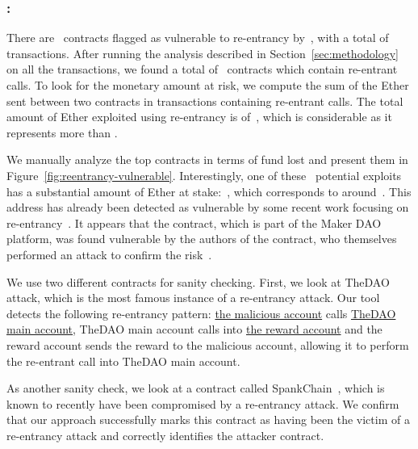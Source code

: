 \subsubsection{\vre: \reentrancy}
\label{ssec:analysis-re}
There are~ contracts flagged as vulnerable to re-entrancy by~\cite{Luu2016a,Tsankov2018,DBLP:conf/ndss/KalraGDS18}, with a total of~ transactions. After running the analysis described in Section~\ref{sec:methodology} on all the transactions, we found a total of~ contracts which contain re-entrant calls. To look for the monetary amount at risk, we compute the sum of the Ether sent between two contracts in transactions containing re-entrant calls. The total amount of Ether exploited using re-entrancy is of~, which is considerable as it represents more than .

We manually analyze the top contracts in terms of fund lost and present them in Figure~\ref{fig:reentrancy-vulnerable}. Interestingly, one of these~ potential exploits has a substantial amount of Ether at stake:~, which corresponds to around~. This address has already been detected as vulnerable by some recent work focusing on re-entrancy~\cite{Rodler2019}. It appears that the contract, which is part of the Maker DAO~\cite{maker-dao} platform, was found vulnerable by the authors of the contract, who themselves performed an attack to confirm the risk~\cite{ds-eth-token}.

We use two different contracts for sanity checking.
First, we look at TheDAO attack, which is the most famous instance of a re-entrancy attack. Our tool detects the following re-entrancy pattern: \href{https://etherscan.io/address/0xc0ee9db1a9e07ca63e4ff0d5fb6f86bf68d47b89}{the malicious account} calls \href{https://etherscan.io/address/0xbb9bc244d798123fde783fcc1c72d3bb8c189413}{TheDAO main account}, TheDAO main account calls into \href{https://etherscan.io/address/0xd2e16a20dd7b1ae54fb0312209784478d069c7b0}{the reward account} and the reward account sends the reward to the malicious account, allowing it to perform the re-entrant call into TheDAO main account.

As another sanity check, we look at a contract called SpankChain~\cite{spank-chain}, which is known to recently have been compromised by a re-entrancy attack. We confirm that our approach successfully marks this contract as having been the victim of a re-entrancy attack and correctly identifies the attacker contract.

